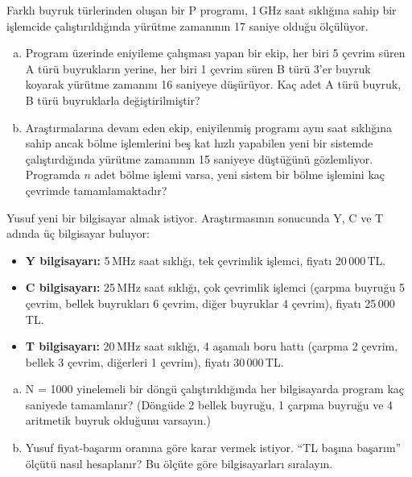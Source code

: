 \begin{alistirma}[\zor]
Farklı buyruk türlerinden oluşan bir P programı, 1\,GHz saat sıklığına sahip bir işlemcide çalıştırıldığında yürütme zamanının 17 saniye olduğu ölçülüyor.
\begin{enumerate}[(a)]
    \item Program üzerinde eniyileme çalışması yapan bir ekip, her biri 5 çevrim süren A türü buyrukların yerine, her biri 1 çevrim süren B türü 3'er buyruk koyarak yürütme zamanını 16 saniyeye düşürüyor. Kaç adet A türü buyruk, B türü buyruklarla değiştirilmiştir?
    \item Araştırmalarına devam eden ekip, eniyilenmiş programı aynı saat sıklığına sahip ancak bölme işlemlerini beş kat hızlı yapabilen yeni bir sistemde çalıştırdığında yürütme zamanının 15 saniyeye düştüğünü gözlemliyor. Programda $n$ adet bölme işlemi varsa, yeni sistem bir bölme işlemini kaç çevrimde tamamlamaktadır?
\end{enumerate}
\end{alistirma}

\begin{alistirma}[\zor]
Yusuf yeni bir bilgisayar almak istiyor. Araştırmasının sonucunda Y, C ve T adında üç bilgisayar buluyor:

\begin{itemize}
    \item \textbf{Y bilgisayarı:} 5\,MHz saat sıklığı, tek çevrimlik işlemci, fiyatı 20\,000\,TL.
    \item \textbf{C bilgisayarı:} 25\,MHz saat sıklığı, çok çevrimlik işlemci (çarpma buyruğu 5 çevrim, bellek buyrukları 6 çevrim, diğer buyruklar 4 çevrim), fiyatı 25\,000\,TL.
    \item \textbf{T bilgisayarı:} 20\,MHz saat sıklığı, 4 aşamalı boru hattı (çarpma 2 çevrim, bellek 3 çevrim, diğerleri 1 çevrim), fiyatı 30\,000\,TL.
\end{itemize}

\begin{enumerate}[(a)]
    \item N = 1000 yinelemeli bir döngü çalıştırıldığında her bilgisayarda program kaç saniyede tamamlanır? (Döngüde 2 bellek buyruğu, 1 çarpma buyruğu ve 4 aritmetik buyruk olduğunu varsayın.)
    \item Yusuf fiyat-başarım oranına göre karar vermek istiyor. ``TL başına başarım'' ölçütü nasıl hesaplanır? Bu ölçüte göre bilgisayarları sıralayın.
\end{enumerate}
\end{alistirma}


